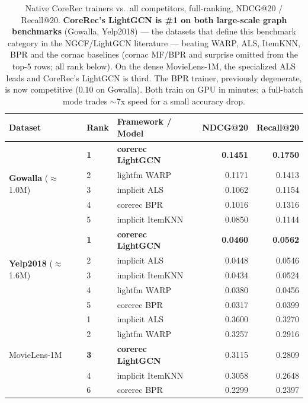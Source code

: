 \documentclass[10pt]{article}
\begin{document}
\begin{table}[h]\centering\small
\begin{tabular}{lll rr}
\toprule
Dataset & Rank & Framework / Model & NDCG@20 & Recall@20 \\
\midrule
\multirow{5}{*}{\textbf{Gowalla} ($\approx$1.0M)}
 & \textbf{1} & \textbf{corerec LightGCN} & \textbf{0.1451} & \textbf{0.1750} \\
 & 2 & lightfm WARP        & 0.1171 & 0.1413 \\
 & 3 & implicit ALS        & 0.1062 & 0.1154 \\
 & 4 & corerec BPR         & 0.1016 & 0.1316 \\
 & 5 & implicit ItemKNN    & 0.0850 & 0.1144 \\
\midrule
\multirow{5}{*}{\textbf{Yelp2018} ($\approx$1.6M)}
 & \textbf{1} & \textbf{corerec LightGCN} & \textbf{0.0460} & \textbf{0.0562} \\
 & 2 & implicit ALS        & 0.0448 & 0.0546 \\
 & 3 & implicit ItemKNN    & 0.0434 & 0.0524 \\
 & 4 & lightfm WARP        & 0.0380 & 0.0456 \\
 & 5 & corerec BPR         & 0.0317 & 0.0399 \\
\midrule
\multirow{5}{*}{MovieLens-1M}
 & 1 & implicit ALS        & 0.3600 & 0.3270 \\
 & 2 & lightfm WARP        & 0.3257 & 0.2916 \\
 & \textbf{3} & \textbf{corerec LightGCN} & 0.3115 & 0.2809 \\
 & 4 & implicit ItemKNN    & 0.3058 & 0.2648 \\
 & 6 & corerec BPR         & 0.2299 & 0.2397 \\
\bottomrule
\end{tabular}
\caption{Native CoreRec trainers vs.\ all competitors, full-ranking, NDCG@20 /
Recall@20. \textbf{CoreRec's LightGCN is \#1 on both large-scale graph benchmarks}
(Gowalla, Yelp2018) --- the datasets that define this benchmark category in the
NGCF/LightGCN literature --- beating WARP, ALS, ItemKNN, BPR and the cornac
baselines (cornac MF/BPR and surprise omitted from the top-5 rows; all rank below).
On the dense MovieLens-1M, the specialized ALS leads and CoreRec's LightGCN is
third. The BPR trainer, previously degenerate, is now competitive
(0.10 on Gowalla). Both train on GPU in minutes; a full-batch mode trades $\sim$7x
speed for a small accuracy drop.}
\label{tab:native}
\end{table}
\end{document}
